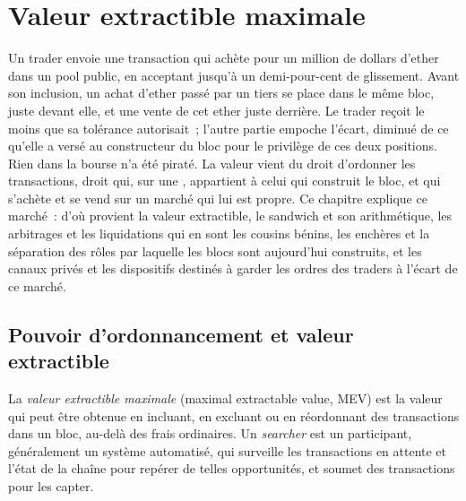 \chapter{Valeur extractible maximale}\label{ch:m3:maximal-extractable-value}

Un trader envoie une transaction qui achète pour un million de dollars d'ether dans un pool public, en acceptant jusqu'à
un demi-pour-cent de glissement. Avant son inclusion, un achat d'ether passé par un tiers se place dans le même
bloc, juste devant elle, et une vente de cet ether juste derrière. Le trader reçoit le moins que sa
tolérance autorisait~; l'autre partie empoche l'écart, diminué de ce qu'elle a versé au constructeur du bloc pour
le privilège de ces deux positions. Rien dans la bourse n'a été piraté. La valeur vient du droit
d'ordonner les transactions, droit qui, sur une , appartient à celui qui construit le bloc, et qui s'achète et
se vend sur un marché qui lui est propre. Ce chapitre explique ce marché~: d'où provient la valeur extractible, le
sandwich et son arithmétique, les arbitrages et les liquidations qui en sont les cousins bénins, les enchères et
la séparation des rôles par laquelle les blocs sont aujourd'hui construits, et les canaux privés et les dispositifs destinés à
garder les ordres des traders à l'écart de ce marché.

\section{Pouvoir d'ordonnancement et valeur extractible}

\begin{definition}\label{def:m3:maximal-extractable-value:mev}
La \emph{valeur extractible maximale} (maximal extractable value, MEV) est la valeur qui peut être obtenue en
incluant, en excluant ou en réordonnant des transactions dans un bloc, au-delà des frais ordinaires. Un
\emph{searcher} est un participant, généralement un système automatisé, qui surveille les transactions
en attente et l'état de la chaîne pour repérer de telles opportunités, et soumet des transactions pour les capter.
\end{definition}

